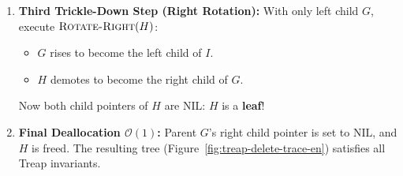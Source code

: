 \begin{enumerate}
    \item \textbf{Third Trickle-Down Step (Right Rotation):}
    With only left child $G$, execute $\textsc{Rotate-Right}(H)$:
    \begin{itemize}
        \item $G$ rises to become the left child of $I$.
        \item $H$ demotes to become the right child of $G$.
    \end{itemize}
    Now both child pointers of $H$ are $\mathrm{NIL}$: $H$ is a \textbf{leaf}!
    
    \item \textbf{Final Deallocation $\mathcal{O}(1)$:}
    Parent $G$'s right child pointer is set to $\mathrm{NIL}$, and $H$ is freed. The resulting tree (Figure~\ref{fig:treap-delete-trace-en}) satisfies all Treap invariants.
\end{enumerate}

